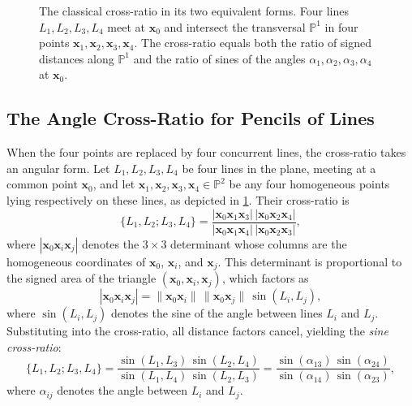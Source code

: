 \documentclass{birkjour}
\theoremstyle{definition}
\theoremstyle{remark}
\begin{document}
\begin{figure}[ht]
\caption{The classical cross-ratio in its two equivalent forms. Four
lines $L_1, L_2, L_3, L_4$ meet at $\mathbf{x}_0$ and intersect the
transversal $\mathbb{P}^1$ in four points $\mathbf{x}_1, \mathbf{x}_2,
\mathbf{x}_3, \mathbf{x}_4$. The cross-ratio equals both the ratio of
signed distances along $\mathbb{P}^1$ and the ratio of sines of the
angles $\alpha_1, \alpha_2, \alpha_3, \alpha_4$ at $\mathbf{x}_0$.}
\label{fig:crossratio-unified}
\end{figure}

\subsection{The Angle Cross-Ratio for Pencils of Lines}
\label{sec:sine-cr}

When the four points are replaced by four concurrent lines, the
cross-ratio takes an angular form. Let $L_1, L_2, L_3, L_4$ be four lines in the plane, meeting at a common point $\mathbf{x}_0$, and let
$\mathbf{x}_1, \mathbf{x}_2, \mathbf{x}_3, \mathbf{x}_4 \in \mathbb{P}^2$ be any four homogeneous points lying respectively on these lines, as depicted in \cref{fig:crossratio-unified}. Their cross-ratio is
\begin{equation}
  \{L_1, L_2; L_3, L_4\}
  = \frac{|\mathbf{x}_0\mathbf{x}_1\mathbf{x}_3|\,|\mathbf{x}_0\mathbf{x}_2\mathbf{x}_4|}
         {|\mathbf{x}_0\mathbf{x}_1\mathbf{x}_4|\,|\mathbf{x}_0\mathbf{x}_2\mathbf{x}_3|},
\end{equation}
where $|\mathbf{x}_0\mathbf{x}_i\mathbf{x}_j|$ denotes the $3\times 3$
determinant whose columns are the homogeneous coordinates of
$\mathbf{x}_0$, $\mathbf{x}_i$, and $\mathbf{x}_j$. This determinant is proportional to the signed area of the triangle $(\mathbf{x}_0, \mathbf{x}_i, \mathbf{x}_j)$, which
factors as
\begin{equation}
  |\mathbf{x}_0\mathbf{x}_i\mathbf{x}_j|
  = \|\mathbf{x}_0\mathbf{x}_i\|\,\|\mathbf{x}_0\mathbf{x}_j\|\,\sin(L_i, L_j),
\end{equation}
where $\sin(L_i, L_j)$ denotes the sine of the angle
between lines $L_i$ and $L_j$. Substituting into the cross-ratio, all
distance factors cancel, yielding the \emph{sine cross-ratio}:
\begin{equation}
  \{L_1, L_2; L_3, L_4\}
  = \frac{\sin(L_1, L_3)\,\sin(L_2, L_4)}
         {\sin(L_1, L_4)\,\sin(L_2, L_3)}
  = \frac{\sin(\alpha_{13}) \, \sin(\alpha_{24})}{\sin(\alpha_{14}) \, \sin(\alpha_{23})},
\end{equation}
where $\alpha_{ij}$ denotes the angle between $L_i$ and $L_j$.
\end{document}
